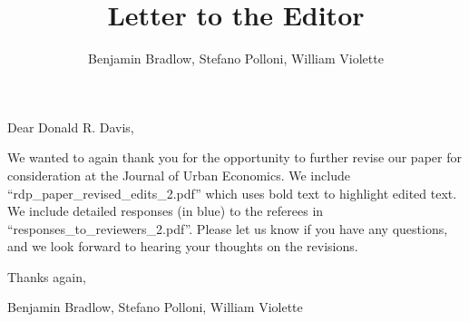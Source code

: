 \documentclass{article}
\title{Letter to the Editor}
\author{Benjamin Bradlow, Stefano Polloni, William Violette}
\newcounter{reviewer}
\begin{document}
\maketitle



\noindent Dear Donald R. Davis,
\vspace{1em}

We wanted to again thank you for the opportunity to further revise our paper for consideration at the Journal of Urban Economics.  We include ``rdp\_paper\_revised\_edits\_2.pdf'' which uses bold text to highlight edited text.  We include  detailed responses (in blue) to the referees in ``responses\_to\_reviewers\_2.pdf''. Please let us know if you have any questions, and we look forward to hearing your thoughts on the revisions.
\vspace{.1em}

\noindent Thanks again,
\vspace{1em}

Benjamin Bradlow, Stefano Polloni, William Violette
\\
\vspace{1cm}
\end{document}
